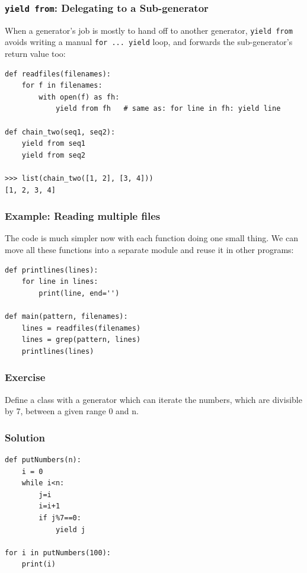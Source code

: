 \begin{frame}[fragile]\frametitle{\texttt{yield from}: Delegating to a Sub-generator}
When a generator's job is mostly to hand off to another generator, \lstinline|yield from| avoids
writing a manual \lstinline|for ... yield| loop, and forwards the sub-generator's return value
too:
\begin{lstlisting}
def readfiles(filenames):
    for f in filenames:
        with open(f) as fh:
            yield from fh   # same as: for line in fh: yield line

def chain_two(seq1, seq2):
    yield from seq1
    yield from seq2

>>> list(chain_two([1, 2], [3, 4]))
[1, 2, 3, 4]
\end{lstlisting}
\end{frame}

\begin{frame}[fragile]\frametitle{Example: Reading multiple files}
The code is much simpler now with each function doing one small thing. We can move all these
functions into a separate module and reuse it in other programs:
\begin{lstlisting}
def printlines(lines):
    for line in lines:
        print(line, end='')

def main(pattern, filenames):
    lines = readfiles(filenames)
    lines = grep(pattern, lines)
    printlines(lines)
\end{lstlisting}
\end{frame}

\begin{frame}[fragile]\frametitle{Exercise}
Define a class with a generator which can iterate the numbers, which are divisible by 7, between a given range 0 and n.

\end{frame}

\begin{frame}[fragile]\frametitle{Solution}
\begin{lstlisting}
def putNumbers(n):
    i = 0
    while i<n:
        j=i
        i=i+1
        if j%7==0:
            yield j

for i in putNumbers(100):
    print(i)
\end{lstlisting}
\end{frame}


